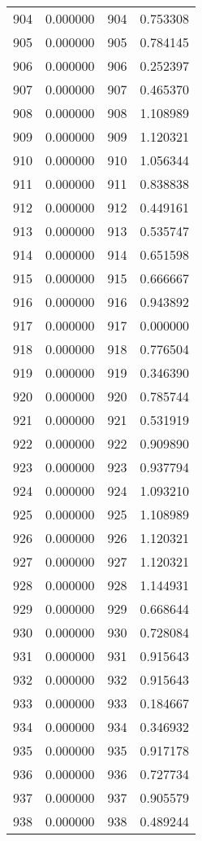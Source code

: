 \documentclass[12pt]{article}
\begin{document}
\begin{longtable}{@{}cccc@{}}
904 & 0.000000 & 904 & 0.753308 \\
905 & 0.000000 & 905 & 0.784145 \\
906 & 0.000000 & 906 & 0.252397 \\
907 & 0.000000 & 907 & 0.465370 \\
908 & 0.000000 & 908 & 1.108989 \\
909 & 0.000000 & 909 & 1.120321 \\
910 & 0.000000 & 910 & 1.056344 \\
911 & 0.000000 & 911 & 0.838838 \\
912 & 0.000000 & 912 & 0.449161 \\
913 & 0.000000 & 913 & 0.535747 \\
914 & 0.000000 & 914 & 0.651598 \\
915 & 0.000000 & 915 & 0.666667 \\
916 & 0.000000 & 916 & 0.943892 \\
917 & 0.000000 & 917 & 0.000000 \\
918 & 0.000000 & 918 & 0.776504 \\
919 & 0.000000 & 919 & 0.346390 \\
920 & 0.000000 & 920 & 0.785744 \\
921 & 0.000000 & 921 & 0.531919 \\
922 & 0.000000 & 922 & 0.909890 \\
923 & 0.000000 & 923 & 0.937794 \\
924 & 0.000000 & 924 & 1.093210 \\
925 & 0.000000 & 925 & 1.108989 \\
926 & 0.000000 & 926 & 1.120321 \\
927 & 0.000000 & 927 & 1.120321 \\
928 & 0.000000 & 928 & 1.144931 \\
929 & 0.000000 & 929 & 0.668644 \\
930 & 0.000000 & 930 & 0.728084 \\
931 & 0.000000 & 931 & 0.915643 \\
932 & 0.000000 & 932 & 0.915643 \\
933 & 0.000000 & 933 & 0.184667 \\
934 & 0.000000 & 934 & 0.346932 \\
935 & 0.000000 & 935 & 0.917178 \\
936 & 0.000000 & 936 & 0.727734 \\
937 & 0.000000 & 937 & 0.905579 \\
938 & 0.000000 & 938 & 0.489244 \\

\end{longtable}
\end{document}
